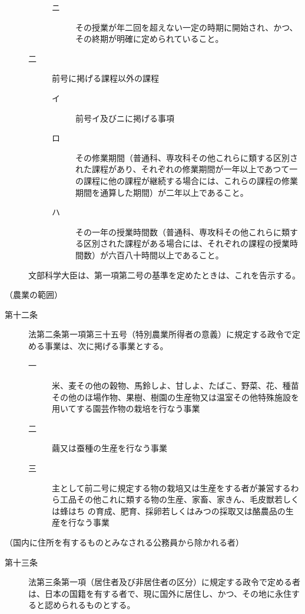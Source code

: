 \documentclass[twocolumn,a4j,10pt]{ltjtarticle}
\begin{document}
\begin{description}
\begin{description}
\begin{description}
\item[ニ]その授業が年二回を超えない一定の時期に開始され、かつ、その終期が明確に定められていること。
\end{description}
\item[二]前号に掲げる課程以外の課程
\begin{description}
\item[イ]前号イ及びニに掲げる事項
\item[ロ]その修業期間（普通科、専攻科その他これらに類する区別された課程があり、それぞれの修業期間が一年以上であつて一の課程に他の課程が継続する場合には、これらの課程の修業期間を通算した期間）が二年以上であること。
\item[ハ]その一年の授業時間数（普通科、専攻科その他これらに類する区別された課程がある場合には、それぞれの課程の授業時間数）が六百八十時間以上であること。
\end{description}
\end{description}
\item[\rensuji{3}]文部科学大臣は、第一項第二号の基準を定めたときは、これを告示する。
\end{description}
\noindent\hspace{10pt}（農業の範囲）
\begin{description}
\item[第十二条]法第二条第一項第三十五号（特別農業所得者の意義）に規定する政令で定める事業は、次に掲げる事業とする。
\begin{description}
\item[一]米、麦その他の穀物、馬鈴しよ、甘しよ、たばこ、野菜、花、種苗その他のほ場作物、果樹、樹園の生産物又は温室その他特殊施設を用いてする園芸作物の栽培を行なう事業
\item[二]繭又は蚕種の生産を行なう事業
\item[三]主として前二号に規定する物の栽培又は生産をする者が兼営するわら工品その他これに類する物の生産、家畜、家きん、毛皮獣若しくは蜂はち
の育成、肥育、採卵若しくはみつの採取又は酪農品の生産を行なう事業
\end{description}
\end{description}
\noindent\hspace{10pt}（国内に住所を有するものとみなされる公務員から除かれる者）
\begin{description}
\item[第十三条]法第三条第一項（居住者及び非居住者の区分）に規定する政令で定める者は、日本の国籍を有する者で、現に国外に居住し、かつ、その地に永住すると認められるものとする。
\end{description}
\end{document}
